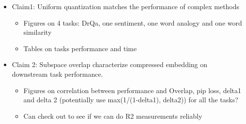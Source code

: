 \begin{itemize}
\item Claim1: Uniform quantization matches the performance of complex methods
	\begin{itemize}
		\item Figures on 4 tasks: DrQa, one sentiment, one word analogy and one word similarity
		\item Tables on tasks performance and time
	\end{itemize}
\item Claim 2: Subspace overlap characterize compressed embedding on downstream task performance.
	\begin{itemize}
		\item Figures on correlation between performance and Overlap, pip loss, delta1 and delta 2 (potentially use max(1/(1-delta1), delta2)) for all the tasks?
		\item Can check out to see if we can do R2 measurements reliably
	\end{itemize}
\end{itemize}

